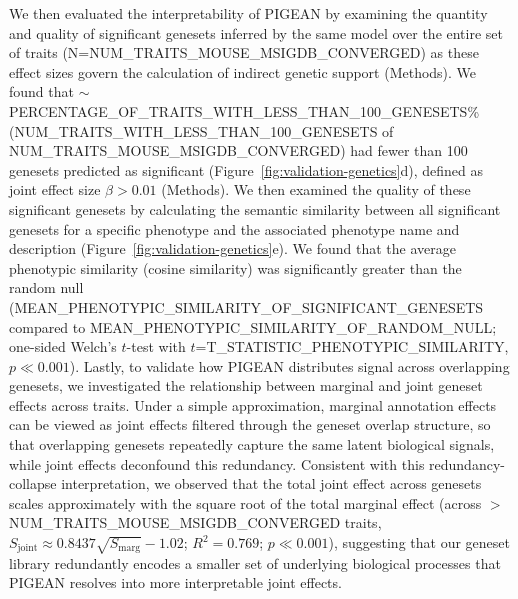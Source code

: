 We then evaluated the interpretability of PIGEAN by examining the quantity and quality of significant genesets inferred by the same model over the entire set of traits (N={{NUM_TRAITS_MOUSE_MSIGDB_CONVERGED}}) as these effect sizes govern the calculation of indirect genetic support (Methods). We found that $\sim${{PERCENTAGE_OF_TRAITS_WITH_LESS_THAN_100_GENESETS}}\% ({{NUM_TRAITS_WITH_LESS_THAN_100_GENESETS}} of {{NUM_TRAITS_MOUSE_MSIGDB_CONVERGED}}) had fewer than 100 genesets predicted as significant (Figure~\ref{fig:validation-genetics}d), defined as joint effect size $\beta > 0.01$ (Methods). We then examined the quality of these significant genesets by calculating the semantic similarity between all significant genesets for a specific phenotype and the associated phenotype name and description (Figure~\ref{fig:validation-genetics}e). We found that the average phenotypic similarity (cosine similarity) was significantly greater than the random null ({{MEAN_PHENOTYPIC_SIMILARITY_OF_SIGNIFICANT_GENESETS}} compared to {{MEAN_PHENOTYPIC_SIMILARITY_OF_RANDOM_NULL}}; one-sided Welch's $t$-test with $t$={{T_STATISTIC_PHENOTYPIC_SIMILARITY}}, $p \ll 0.001$). Lastly, to validate how PIGEAN distributes signal across overlapping genesets, we investigated the relationship between marginal and joint geneset effects across traits. Under a simple approximation, marginal annotation effects can be viewed as joint effects filtered through the geneset overlap structure, so that overlapping genesets repeatedly capture the same latent biological signals, while joint effects deconfound this redundancy. Consistent with this redundancy-collapse interpretation, we observed that the total joint effect across genesets scales approximately with the square root of the total marginal effect (across $>${{NUM_TRAITS_MOUSE_MSIGDB_CONVERGED}} traits, $S_{\mathrm{joint}} \approx 0.8437\sqrt{S_{\mathrm{marg}}} - 1.02$; $R^2=0.769$; $p \ll 0.001$), suggesting that our geneset library redundantly encodes a smaller set of underlying biological processes that PIGEAN resolves into more interpretable joint effects.
